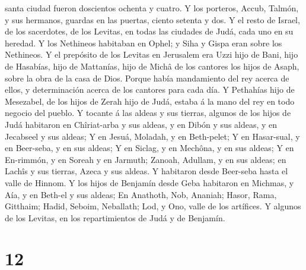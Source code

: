 santa ciudad fueron doscientos ochenta y cuatro.  Y los
porteros, Accub, Talmón, y sus hermanos, guardas en las puertas, ciento
setenta y dos.  Y el resto de Israel, de los sacerdotes,
de los Levitas, en todas las ciudades de Judá, cada uno en su heredad.
 Y los Nethineos habitaban en Ophel; y Siha y Gispa eran
sobre los Nethineos.  Y el prepósito de los Levitas en
Jerusalem era Uzzi hijo de Bani, hijo de Hasabías, hijo de Mattanías,
hijo de Michâ de los cantores los hijos de Asaph, sobre la obra de la
casa de Dios.  Porque había mandamiento del rey acerca de
ellos, y determinación acerca de los cantores para cada día.
 Y Pethahías hijo de Mesezabel, de los hijos de Zerah
hijo de Judá, estaba á la mano del rey en todo negocio del pueblo.
 Y tocante á las aldeas y sus tierras, algunos de los
hijos de Judá habitaron en Chîriat-arba y sus aldeas, y en Dibón y sus
aldeas, y en Jecabseel y sus aldeas;  Y en Jesuá,
Moladah, y en Beth-pelet;  Y en Hasar-sual, y en
Beer-seba, y en sus aldeas;  Y en Siclag, y en Mechôna, y
en sus aldeas;  Y en En-rimmón, y en Soreah y en Jarmuth;
 Zanoah, Adullam, y en sus aldeas; en Lachîs y sus
tierras, Azeca y sus aldeas. Y habitaron desde Beer-seba hasta el valle
de Hinnom.  Y los hijos de Benjamín desde Geba habitaron
en Michmas, y Aía, y en Beth-el y sus aldeas;  En
Anathoth, Nob, Ananiah;  Hasor, Rama, Gitthaim;
 Hadid, Seboim, Neballath;  Lod, y Ono,
valle de los artífices.  Y algunos de los Levitas, en los
repartimientos de Judá y de Benjamín.

\hypertarget{section-11}{%
\section{12}\label{section-11}}

